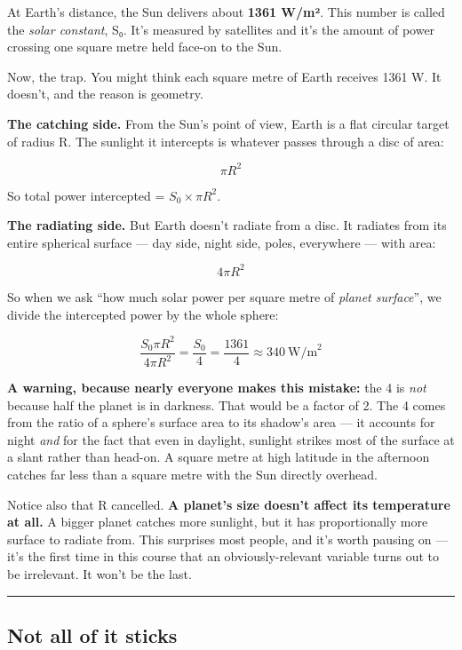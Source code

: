 At Earth's distance, the Sun delivers about \textbf{1361 W/m²}. This
number is called the \emph{solar constant}, S₀. It's measured by
satellites and it's the amount of power crossing one square metre held
face-on to the Sun.

Now, the trap. You might think each square metre of Earth receives 1361
W. It doesn't, and the reason is geometry.

\textbf{The catching side.} From the Sun's point of view, Earth is a
flat circular target of radius R. The sunlight it intercepts is whatever
passes through a disc of area:

\[ \pi R^2 \]

So total power intercepted = \(S_0 \times \pi R^2\).

\textbf{The radiating side.} But Earth doesn't radiate from a disc. It
radiates from its entire spherical surface --- day side, night side,
poles, everywhere --- with area:

\[ 4\pi R^2 \]

So when we ask ``how much solar power per square metre of \emph{planet
surface}'', we divide the intercepted power by the whole sphere:

\[ \frac{S_0 \pi R^2}{4 \pi R^2} = \frac{S_0}{4} = \frac{1361}{4} \approx 340 \ \text{W/m}^2 \]

\textbf{A warning, because nearly everyone makes this mistake:} the 4 is
\emph{not} because half the planet is in darkness. That would be a
factor of 2. The 4 comes from the ratio of a sphere's surface area to
its shadow's area --- it accounts for night \emph{and} for the fact that
even in daylight, sunlight strikes most of the surface at a slant rather
than head-on. A square metre at high latitude in the afternoon catches
far less than a square metre with the Sun directly overhead.

Notice also that R cancelled. \textbf{A planet's size doesn't affect its
temperature at all.} A bigger planet catches more sunlight, but it has
proportionally more surface to radiate from. This surprises most people,
and it's worth pausing on --- it's the first time in this course that an
obviously-relevant variable turns out to be irrelevant. It won't be the
last.

\begin{center}\rule{0.5\linewidth}{0.5pt}\end{center}

\subsection{Not all of it sticks}\label{not-all-of-it-sticks}

